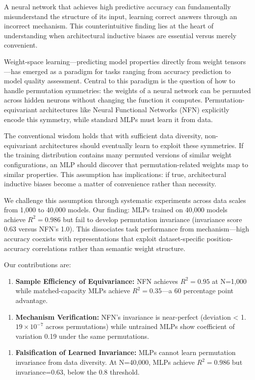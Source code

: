 
A neural network that achieves high predictive accuracy can fundamentally misunderstand the structure of its input, learning correct answers through an incorrect mechanism. This counterintuitive finding lies at the heart of understanding when architectural inductive biases are essential versus merely convenient.

Weight-space learning---predicting model properties directly from weight tensors---has emerged as a paradigm for tasks ranging from accuracy prediction to model quality assessment. Central to this paradigm is the question of how to handle permutation symmetries: the weights of a neural network can be permuted across hidden neurons without changing the function it computes. Permutation-equivariant architectures like Neural Functional Networks (NFN) explicitly encode this symmetry, while standard MLPs must learn it from data.

The conventional wisdom holds that with sufficient data diversity, non-equivariant architectures should eventually learn to exploit these symmetries. If the training distribution contains many permuted versions of similar weight configurations, an MLP should discover that permutation-related weights map to similar properties. This assumption has implications: if true, architectural inductive biases become a matter of convenience rather than necessity.

We challenge this assumption through systematic experiments across data scales from 1,000 to 40,000 models. Our finding: MLPs trained on 40,000 models achieve $R^{2}=0.986$ but fail to develop permutation invariance (invariance score 0.63 versus NFN's 1.0). This dissociates task performance from mechanism---high accuracy coexists with representations that exploit dataset-specific position-accuracy correlations rather than semantic weight structure.

Our contributions are:

\begin{enumerate}
\item \textbf{Sample Efficiency of Equivariance:} NFN achieves $R^{2}=0.95$ at N=1,000 while matched-capacity MLPs achieve $R^{2}=0.35$---a 60 percentage point advantage.
\end{enumerate}

\begin{enumerate}
\item \textbf{Mechanism Verification:} NFN's invariance is near-perfect (deviation < 1.$19\times 10^{-7}$ across permutations) while untrained MLPs show coefficient of variation 0.19 under the same permutations.
\end{enumerate}

\begin{enumerate}
\item \textbf{Falsification of Learned Invariance:} MLPs cannot learn permutation invariance from data diversity. At N=40,000, MLPs achieve $R^{2}=0.986$ but invariance=0.63, below the 0.8 threshold.
\end{enumerate}

